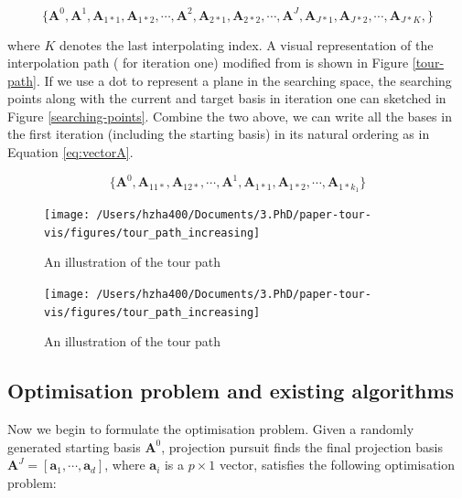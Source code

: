 \documentclass[12pt]{article}
\begin{document}
\begin{equation}
\{ 
\mathbf{A}^0, 
\mathbf{A}^1, 
\mathbf{A}_{1 \ast 1}, 
\mathbf{A}_{1 \ast 2},
\cdots, 
\mathbf{A}^2, 
\mathbf{A}_{2 \ast 1}, 
\mathbf{A}_{2 \ast 2}, 
\cdots, 
\mathbf{A}^J,
\mathbf{A}_{J \ast 1}, 
\mathbf{A}_{J \ast 2}, 
\cdots, 
\mathbf{A}_{J \ast K},
\}
\label{eq:interp-path}
\end{equation}

where \(K\) denotes the last interpolating index. A visual
representation of the interpolation path ( for iteration one) modified
from \citet{buja2005computational} is shown in Figure \ref{tour-path}.
If we use a dot to represent a plane in the searching space, the
searching points along with the current and target basis in iteration
one can sketched in Figure \ref{searching-points}. Combine the two
above, we can write all the bases in the first iteration (including the
starting basis) in its natural ordering as in Equation \ref{eq:vectorA}.

\begin{equation}
\{
\mathbf{A}^{0}, 
\mathbf{A}_{1 1\ast}, 
\mathbf{A}_{1 2\ast}, 
\cdots, 
\mathbf{A}^{1},
\mathbf{A}_{1\ast 1}, 
\mathbf{A}_{1\ast 2},  
\cdots, 
\mathbf{A}_{1\ast k_1}
\}
\label{eq:vectorA}
\end{equation}

\begin{figure}
\texttt{[image: /Users/hzha400/Documents/3.PhD/paper-tour-vis/figures/tour\_path\_increasing]} \caption{\label{tour-path}An illustration of the tour path}\label{fig:tour-path}
\end{figure}

\begin{figure}
\texttt{[image: /Users/hzha400/Documents/3.PhD/paper-tour-vis/figures/tour\_path\_increasing]} \caption{\label{searching-points}An illustration of the tour path}\label{fig:searching-points}
\end{figure}

\hypertarget{optimisation-problem-and-existing-algorithms}{%
\subsection{Optimisation problem and existing
algorithms}\label{optimisation-problem-and-existing-algorithms}}

Now we begin to formulate the optimisation problem. Given a randomly
generated starting basis \(\mathbf{A}^0\), projection pursuit finds the
final projection basis
\(\mathbf{A}^J = [\mathbf{a}_1, \cdots, \mathbf{a}_d]\), where
\(\mathbf{a}_i\) is a \(p \times 1\) vector, satisfies the following
optimisation problem:
\end{document}
